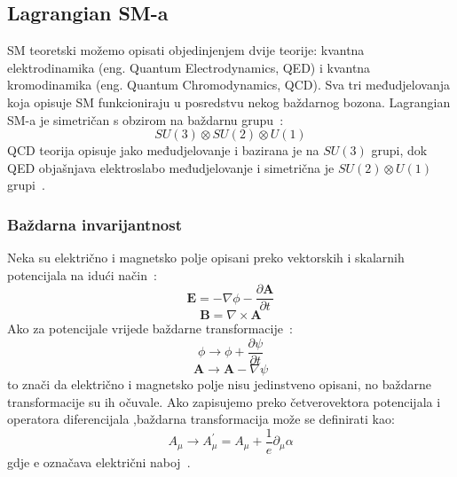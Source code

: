 \documentclass[12pt,a4paper,oneside]{article}
\begin{document}
\begin{linenumbers}
		\subsection{Lagrangian SM-a}
		SM teoretski možemo opisati objedinjenjem dvije teorije: kvantna elektrodinamika (eng. Quantum Electrodynamics, QED) i kvantna kromodinamika (eng. Quantum Chromodynamics, QCD). Sva tri međudjelovanja koja opisuje SM funkcioniraju u posredstvu nekog baždarnog bozona. Lagrangian SM-a je simetričan s obzirom na baždarnu grupu~\cite{doktorat}: 
		\begin{equation}
		SU(3) \otimes SU(2) \otimes U(1)
		\end{equation}
		QCD teorija opisuje jako međudjelovanje i bazirana je na \begin{math}
		SU(3)
		\end{math}  grupi, dok  QED objašnjava elektroslabo međudjelovanje i simetrična je \begin{math}
		SU(2) \otimes U(1)
		\end{math} grupi~\cite{doktorat}. 
		
		\subsubsection{Baždarna invarijantnost}
		Neka su električno i magnetsko polje opisani preko vektorskih i skalarnih potencijala na idući način~\cite{dokt2}:
		\begin{equation}
		\boldsymbol{E} = -\nabla \phi - \frac{\partial \boldsymbol{A}}{\partial t}
		\end{equation}
		\begin{equation}
		\boldsymbol{B} = \nabla \times \boldsymbol{A}
		\end{equation}
		Ako za potencijale vrijede baždarne transformacije~\cite{dokt2}:
		\begin{equation}
		\phi \rightarrow \phi + \frac{\partial \psi}{\partial t}
		\end{equation}
		\begin{equation}
		\boldsymbol{A} \rightarrow \boldsymbol{A} - \nabla \psi 
		\end{equation}
		to znači da električno i magnetsko polje nisu jedinstveno opisani, no baždarne transformacije su ih očuvale. Ako zapisujemo preko četverovektora potencijala i operatora diferencijala ,baždarna transformacija može se definirati kao:
		\begin{equation}
		A_\mu \rightarrow A_\mu ^{'} = A_\mu + \frac{1}{e} \partial_\mu \alpha
		\end{equation}
		gdje e označava električni naboj~\cite{dokt2}.
		

\end{linenumbers}
\end{document}

